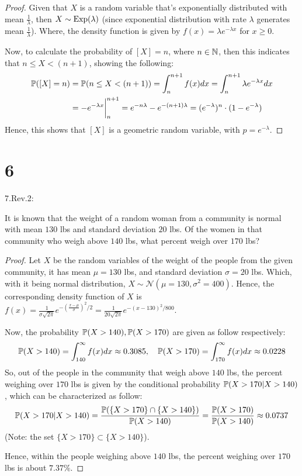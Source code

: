 \documentclass{article}
\begin{document}
\begin{proof}
    Given that $X$ is a random variable that's exponentially distributed with mean $\frac{1}{\lambda}$, then $X\sim\mathrm{Exp}(\lambda)$ (since exponential distribution with rate $\lambda$ generates mean $\frac{1}{\lambda}$). Where, the density function is given by $f(x)=\lambda e^{-\lambda x}$ for $x\geq 0$.

    Now, to calculate the probability of $[X]=n$, where $n\in\mathbb{N}$, then this indicates that $n\leq X<(n+1)$, showing the following:
    \begin{align}
        \mathbb{P}([X]=n)&=\mathbb{P}(n\leq X<(n+1)) = \int_{n}^{n+1}f(x)dx=\int_{n}^{n+1}\lambda e^{-\lambda x}dx\\ 
        &= -e^{-\lambda x}\bigg|_{n}^{n+1} = e^{-n\lambda}-e^{-(n+1)\lambda} = (e^{-\lambda})^n \cdot (1-e^{-\lambda})
    \end{align}
    Hence, this shows that $[X]$ is a geometric random variable, with $p=e^{-\lambda}$.
    
\end{proof}

\hfil

\section*{6}
\begin{ques}\label{q6}
    7.Rev.2:

    It is known that the weight of a random woman from a community is normal with mean $130$ lbs and standard deviation $20$ lbs. Of the women in that community who weigh above $140$ lbs, what percent weigh over $170$ lbs?
\end{ques}

\begin{proof}
    Let $X$ be the random variables of the weight of the people from the given community, it has mean $\mu=130$ lbs, and standard deviation $\sigma=20$ lbs. Which, with it being normal distribution, $X\sim\mathcal{N}(\mu=130, \sigma^2=400)$. Hence, the corresponding density function of $X$ is $f(x)=\frac{1}{\sigma\sqrt{2\pi}}e^{-\left(\frac{x-\mu}{\sigma}\right)^2/2} = \frac{1}{20\sqrt{2\pi}}e^{-(x-130)^2/800}$.

    Now, the probability $\mathbb{P}(X>140), \mathbb{P}(X>170)$ are given as follow respectively:
    \begin{align}
        \mathbb{P}(X>140)=\int_{140}^{\infty}f(x) dx \approx 0.3085,\quad \mathbb{P}(X>170)=\int_{170}^{\infty}f(x) dx\approx 0.0228
    \end{align}
    So, out of the people in the community that weigh above $140$ lbs, the percent weighing over $170$ lbs is given by the conditional probability $\mathbb{P}(X>170 | X>140)$, which can be characterized as follow:
    \begin{align}
        \mathbb{P}(X>170 | X>140)=\frac{\mathbb{P}(\{X>170\}\cap \{X>140\})}{\mathbb{P}(X>140)} = \frac{\mathbb{P}(X>170)}{\mathbb{P}(X>140)}\approx 0.0737
    \end{align}
    (Note: the set $\{X>170\}\subset \{X>140\}$).

    Hence, within the people weighing above $140$ lbs, the percent weighing over $170$ lbs is about $7.37\%$.
\end{proof}
\end{document}
